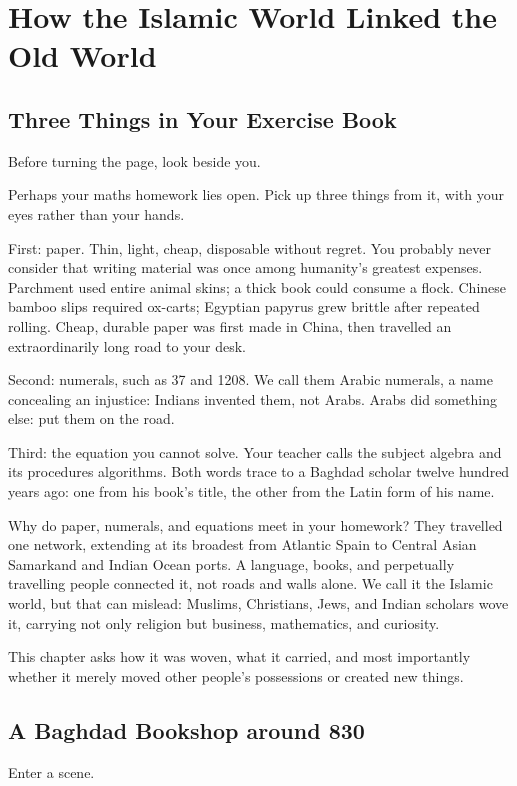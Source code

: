 \chapter[The Islamic World's Connections]{How the Islamic World Linked the Old World}
\section{Three Things in Your Exercise Book}
Before turning the page, look beside you.

Perhaps your maths homework lies open. Pick up three things from it, with your eyes rather than your hands.

First: paper. Thin, light, cheap, disposable without regret. You probably never consider that writing material was once among humanity's greatest expenses. Parchment used entire animal skins; a thick book could consume a flock. Chinese bamboo slips required ox-carts; Egyptian papyrus grew brittle after repeated rolling. Cheap, durable paper was first made in China, then travelled an extraordinarily long road to your desk.

Second: numerals, such as 37 and 1208. We call them Arabic numerals, a name concealing an injustice: Indians invented them, not Arabs. Arabs did something else: put them on the road.

Third: the equation you cannot solve. Your teacher calls the subject algebra and its procedures algorithms. Both words trace to a Baghdad scholar twelve hundred years ago: one from his book's title, the other from the Latin form of his name.

Why do paper, numerals, and equations meet in your homework? They travelled one network, extending at its broadest from Atlantic Spain to Central Asian Samarkand and Indian Ocean ports. A language, books, and perpetually travelling people connected it, not roads and walls alone. We call it the Islamic world, but that can mislead: Muslims, Christians, Jews, and Indian scholars wove it, carrying not only religion but business, mathematics, and curiosity.

This chapter asks how it was woven, what it carried, and most importantly whether it merely moved other people's possessions or created new things.

\section{A Baghdad Bookshop around 830}
Enter a scene.

